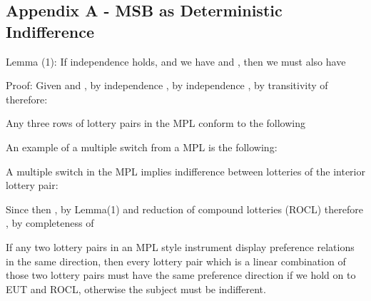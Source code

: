 \subsection{Appendix A - MSB as Deterministic Indifference}

Lemma (1): If independence holds, and we have  and , then we must also have 


Proof:
Given  and 
			, by independence	
			, by independence	
	, by transitivity of
therefore:


Any three rows of lottery pairs in the \textcite[623]{Grether1979} MPL conform to the following



An example of a multiple switch from a MPL is the following:



A multiple switch in the MPL implies indifference between lotteries of the interior lottery pair:

Since		 
then		, by Lemma(1) and reduction of compound lotteries (ROCL)
therefore	, by completeness of 

If any two lottery pairs in an MPL style instrument display preference relations in the same direction, then every lottery pair which is a linear combination of those two lottery pairs must have the same preference direction if we hold on to EUT and ROCL, otherwise the subject must be indifferent.

\newpage

\printbibliography[segment=1, heading=subbibliography]



